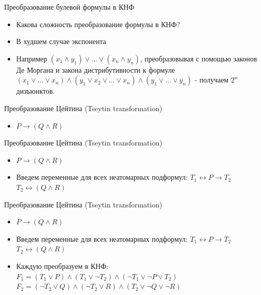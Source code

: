 \documentclass{beamer}
\begin{document}
\begin{frame}{Преобразование булевой формулы в КНФ}
\begin{itemize}
\item Какова сложность преобразование формулы в КНФ?
\item В худшем случае экспонента
\item Например $(x_1 \wedge y_1) \vee \dots \vee (x_n \wedge y_n)$, преобразовывая с помощью законов Де Моргана и закона
дистрибутивности к формуле $(x_1 \vee \dots \vee x_n) \wedge (y_1 \vee x_2 \vee \dots \vee x_n) \wedge (y_1 \vee \dots \vee y_n)$
- получаем $2^n$ дизъюнктов.
\end{itemize}
\end{frame}

\begin{frame}{Преобразование Цейтина (Tseytin transformation)}
\begin{itemize}
\item $P \rightarrow (Q \wedge R)$
\end{itemize}
\end{frame}

\begin{frame}{Преобразование Цейтина (Tseytin transformation)}
\begin{itemize}
\item $P \rightarrow (Q \wedge R)$
\item Введем переменные для всех неатомарных подформул:\newline
$T_1 \leftrightarrow P \rightarrow T_2$\newline
$T_2 \leftrightarrow (Q \wedge R)$\newline
\end{itemize}
\end{frame}

\begin{frame}{Преобразование Цейтина (Tseytin transformation)}
\begin{itemize}
\item $P \rightarrow (Q \wedge R)$
\item Введем переменные для всех неатомарных подформул:\newline
$T_1 \leftrightarrow P \rightarrow T_2$\newline
$T_2 \leftrightarrow (Q \wedge R)$\newline
\item Каждую преобразуем в КНФ:\newline
$F_1 = (T_1 \vee P) \wedge (T_1 \vee \lnot T_2) \wedge (\lnot T_1 \vee \lnot P \vee T_2)$\newline
$F_2 = (\lnot T_2 \vee Q) \wedge (\lnot T_2 \vee R) \wedge (T_2 \vee \lnot Q \vee \lnot R)$\newline
\end{itemize}
\end{frame}
\end{document}
